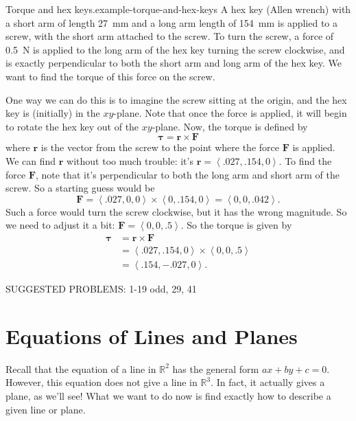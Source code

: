 \documentclass[10pt,]{book}
\numberwithin{equation}{section}
\newcommand{\RR}{\mathbb{R}}
\newcommand{\vv}[1]{\mathbf{#1}}
\newcommand{\dotprod}[1]{\left\langle #1 \right\rangle}
\begin{document}
\begin{example}{Torque and hex keys.}{example-torque-and-hex-keys}%
\hypertarget{p-1194}{}%
A hex key (Allen wrench) with a short arm of length \SI{27}{\milli\meter} and a long arm length of \SI{154}{\milli\meter} is applied to a screw, with the short arm attached to the screw. To turn the screw, a force of \SI{0.5}{\newton} is applied to the long arm of the hex key turning the screw clockwise, and is exactly perpendicular to both the short arm and long arm of the hex key. We want to find the torque of this force on the screw.%
\par
\hypertarget{p-1195}{}%
One way we can do this is to imagine the screw sitting at the origin, and the hex key is (initially) in the \(xy\)-plane. Note that once the force is applied, it will begin to rotate the hex key out of the \(xy\)-plane. Now, the torque is defined by%
%
\begin{equation*}
\boldsymbol{\tau} = \vv{r}\times\vv{F}
\end{equation*}
\hypertarget{p-1196}{}%
where \(\vv{r}\) is the vector from the screw to the point where the force \(\vv{F}\) is applied. We can find \(\vv{r}\) without too much trouble: it's \(\vv{r} = \dotprod{.027,.154,0}\). To find the force \(\vv{F}\), note that it's perpendicular to both the long arm and short arm of the screw. So a starting guess would be%
%
\begin{equation*}
\vv{F} = \dotprod{.027,0,0}\times\dotprod{0,.154,0} = \dotprod{0,0,.042}.
\end{equation*}
\hypertarget{p-1197}{}%
Such a force would turn the screw clockwise, but it has the wrong magnitude. So we need to adjust it a bit: \(\vv{F} = \dotprod{0,0,.5}\). So the torque is given by%
%
\begin{align*}
\mathbf{\tau} &= \vv{r}\times\vv{F} \\
& = \dotprod{.027,.154,0}\times\dotprod{0,0,.5} \\
& = \dotprod{.154,-.027,0}. 
\end{align*}
\end{example}
\begin{conclusion}{}%
\hypertarget{p-1198}{}%
SUGGESTED PROBLEMS: 1-19 odd, 29, 41%
\end{conclusion}%
%
%
\typeout{************************************************}
\typeout{************************************************}
%
\section[{Equations of Lines and Planes}]{Equations of Lines and Planes}\label{section-equations-of-lines-and-planes}
\begin{introduction}{}%
\hypertarget{p-1199}{}%
Recall that the equation of a line in \(\RR^{2}\) has the general form \(ax+by + c = 0\). However, this equation does not give a line in \(\RR^{3}\). In fact, it actually gives a plane, as we'll see! What we want to do now is find exactly how to describe a given line or plane.%
\end{introduction}%
%
%
\typeout{************************************************}
\typeout{************************************************}
%
\end{document}

